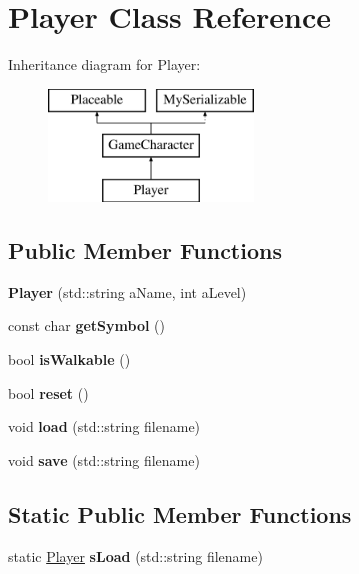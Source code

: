 \hypertarget{class_player}{}\section{Player Class Reference}
\label{class_player}
Inheritance diagram for Player\+:\begin{figure}[H]
\begin{center}
\leavevmode
\includegraphics[height=3.000000cm]{class_player}
\end{center}
\end{figure}
\subsection*{Public Member Functions}
\begin{DoxyCompactItemize}
\item 
\hypertarget{class_player_a8caaecc11d0c3ce25fa13c35f01133b6}{}\label{class_player_a8caaecc11d0c3ce25fa13c35f01133b6} 
{\bfseries Player} (std\+::string a\+Name, int a\+Level)
\item 
\hypertarget{class_player_a219f7853f0085cf37af6f500862eb19b}{}\label{class_player_a219f7853f0085cf37af6f500862eb19b} 
const char {\bfseries get\+Symbol} ()
\item 
\hypertarget{class_player_a4971158246dd9cda8ff8140440eac557}{}\label{class_player_a4971158246dd9cda8ff8140440eac557} 
bool {\bfseries is\+Walkable} ()
\item 
\hypertarget{class_player_a588612b72b0e74ba964662ce96e840f2}{}\label{class_player_a588612b72b0e74ba964662ce96e840f2} 
bool {\bfseries reset} ()
\item 
\hypertarget{class_player_ace997edd6d7632c0e28afa5efd5a2174}{}\label{class_player_ace997edd6d7632c0e28afa5efd5a2174} 
void {\bfseries load} (std\+::string filename)
\item 
\hypertarget{class_player_a4d5408ebb2f233bc2157f1e213861369}{}\label{class_player_a4d5408ebb2f233bc2157f1e213861369} 
void {\bfseries save} (std\+::string filename)
\end{DoxyCompactItemize}
\subsection*{Static Public Member Functions}
\begin{DoxyCompactItemize}
\item 
\hypertarget{class_player_ade7d529c6dd53d80e003c94a558ae6b1}{}\label{class_player_ade7d529c6dd53d80e003c94a558ae6b1} 
static \hyperlink{class_player}{Player} {\bfseries s\+Load} (std\+::string filename)
\end{DoxyCompactItemize}
